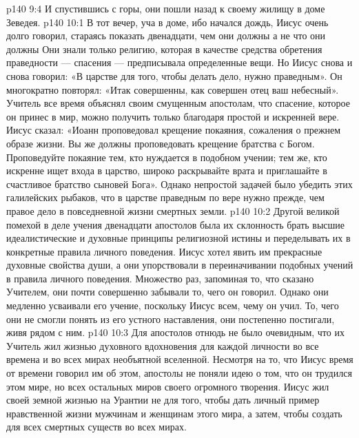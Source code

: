 \vs p140 9:4 \pc И спустившись с горы, они пошли назад к своему жилищу в доме Зеведея.
\vs p140 10:1 В тот вечер, уча в доме, ибо начался дождь, Иисус очень долго говорил, стараясь показать двенадцати, чем они должны  а не что они должны  Они знали только религию, которая в качестве средства обретения праведности --- спасения --- предписывала  определенные вещи. Но Иисус снова и снова говорил: «В царстве для того, чтобы делать дело, нужно  праведным». Он многократно повторял: «Итак  совершенны, как совершен отец ваш небесный». Учитель все время объяснял своим смущенным апостолам, что спасение, которое он принес в мир, можно получить только  благодаря простой и искренней вере. Иисус сказал: «Иоанн проповедовал крещение покаяния, сожаления о прежнем образе жизни. Вы же должны проповедовать крещение братства с Богом. Проповедуйте покаяние тем, кто нуждается в подобном учении; тем же, кто искренне ищет входа в царство, широко раскрывайте врата и приглашайте в счастливое братство сыновей Бога». Однако непростой задачей было убедить этих галилейских рыбаков, что в царстве  праведным по вере нужно прежде, чем  правое дело в повседневной жизни смертных земли.
\vs p140 10:2 \pc Другой великой помехой в деле учения двенадцати апостолов была их склонность брать высшие идеалистические и духовные принципы религиозной истины и переделывать их в конкретные правила личного поведения. Иисус хотел явить им прекрасные духовные свойства души, а они упорствовали в переиначивании подобных учений в правила личного поведения. Множество раз, запоминая то, что сказано Учителем, они почти совершенно забывали то, чего он  говорил. Однако они медленно усваивали его учение, поскольку Иисус  всем, чему он учил. То, чего они не смогли понять из его устного наставления, они постепенно постигали, живя рядом с ним.
\vs p140 10:3 Для апостолов отнюдь не было очевидным, что их Учитель жил жизнью духовного вдохновения для каждой личности во все времена и во всех мирах необъятной вселенной. Несмотря на то, что Иисус время от времени говорил им об этом, апостолы не поняли идею о том, что он трудился  этом мире, но  всех остальных миров своего огромного творения. Иисус жил своей земной жизнью на Урантии не для того, чтобы дать личный пример нравственной жизни мужчинам и женщинам этого мира, а затем, чтобы создать  для всех смертных существ во всех мирах.
